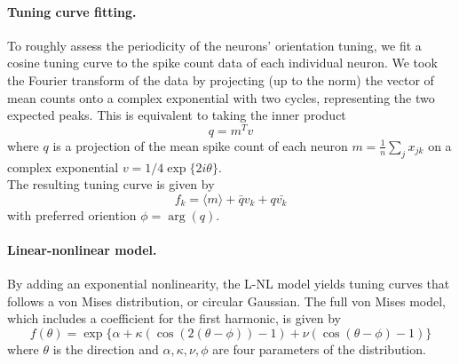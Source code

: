 \documentclass[10pt]{article}
\begin{document}
\paragraph{Tuning curve fitting.} To roughly assess the periodicity of the neurons' orientation tuning, we fit a cosine tuning curve to the spike count data of each individual neuron. We took the Fourier transform of the data by projecting (up to the norm) the vector of mean counts onto a complex exponential with two cycles, representing the two expected peaks. This is equivalent to taking the inner product
\begin{equation*}
q = m^Tv
\end{equation*}
where $q$ is a projection of the mean spike count of each neuron $m = \frac{1}{n} \sum_j x_{jk}$ on a complex exponential $v = 1/4\exp \{2i \theta\} $. \\
The resulting tuning curve is given by
\begin{equation*}
f_k = \langle m \rangle + \bar{q} v_k + q \bar{v_k} 
\end{equation*}
with preferred oriention $\phi = \arg(q)$.

\paragraph{Linear-nonlinear model.} By adding an exponential nonlinearity, the L-NL model yields tuning curves that follows a von Mises distribution, or circular Gaussian. The full von Mises model, which includes a coefficient for the first harmonic, is given by
\begin{equation*}
f(\theta) = \exp\{ \alpha+\kappa(\cos(2(\theta-\phi))-1)+\nu(\cos(\theta-\phi)-1)\}
\end{equation*}
where $\theta$ is the direction and  $\alpha, \kappa, \nu, \phi$ are four parameters of the distribution. \\
\end{document}
